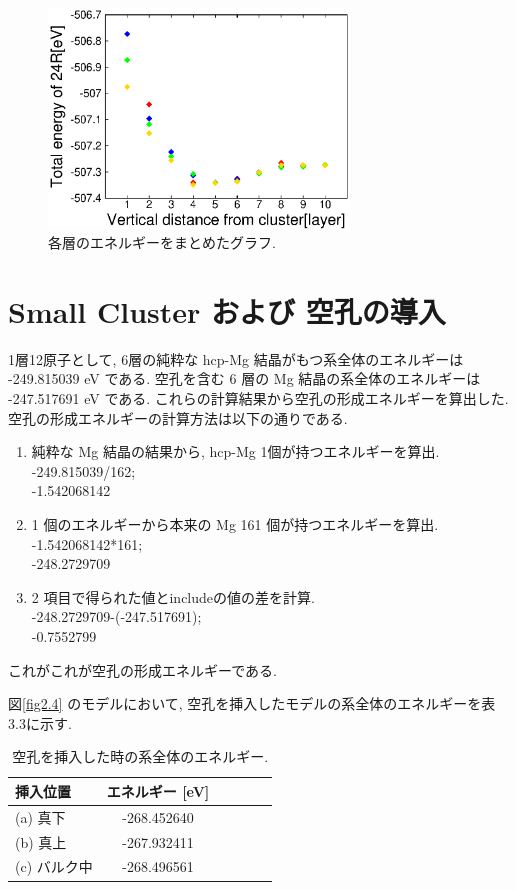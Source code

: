 \begin{figure}[H]
	\begin{center}
		\includegraphics[width=80mm]{../result/small_cluster_Alld_color.eps}
		\caption{各層のエネルギーをまとめたグラフ.}
		\label{fig3.3}
	\end{center}
\end{figure}


\section{ Small Cluster および 空孔の導入}
1層12原子として, 6層の純粋な hcp-Mg 結晶がもつ系全体のエネルギーは -249.815039 eV である. 空孔を含む 6 層の Mg 結晶の系全体のエネルギーは -247.517691 eV である. これらの計算結果から空孔の形成エネルギーを算出した. 空孔の形成エネルギーの計算方法は以下の通りである.

\begin{enumerate}
 \item 純粋な Mg 結晶の結果から, hcp-Mg 1個が持つエネルギーを算出.\\ -249.815039/162;\\
-1.542068142
 \item 1 個のエネルギーから本来の Mg 161 個が持つエネルギーを算出.\\
-1.542068142*161;\\
-248.2729709
 \item 2 項目で得られた値とincludeの値の差を計算.\\
-248.2729709-(-247.517691);\\
-0.7552799
\end{enumerate}
これがこれが空孔の形成エネルギーである.


図\ref{fig2.4} のモデルにおいて, 空孔を挿入したモデルの系全体のエネルギーを表 3.3に示す.

\begin{table}[htb]
\caption{空孔を挿入した時の系全体のエネルギー.}
  \begin{center}
    \begin{tabular}{|l|c|c|c|c|c|} \hline
 挿入位置 & エネルギー [eV] \\ \hline
   (a) 真下 & -268.452640\\
\hline
   (b) 真上 & -267.932411\\
\hline
   (c) バルク中 & -268.496561\\
\hline
    \end{tabular}
  \end{center}
\end{table}
